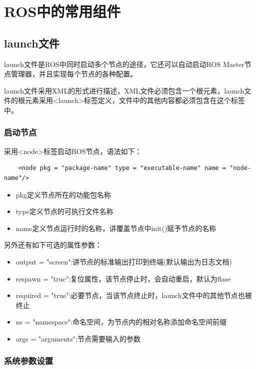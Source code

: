 \documentclass[9pt, oneside]{book}
\begin{document}
\chapter{ROS中的常用组件}

\section{launch文件}

launch文件是ROS中同时启动多个节点的途径，它还可以自动启动ROS Master节点管理器，并且实现每个节点的各种配置。

launch文件采用XML的形式进行描述，XML文件必须包含一个根元素，launch文件的根元素采用<launch>标签定义，文件中的其他内容都必须包含在这个标签中。

\subsection{启动节点}

采用<node>标签启动ROS节点，语法如下：

\begin{verbatim}
    <node pkg = "package-name" type = "executable-name" name = "node-name"/>
\end{verbatim}

\begin{itemize}
    \item pkg定义节点所在的功能包名称
    \item type定义节点的可执行文件名称
    \item name定义节点运行时的名称，讲覆盖节点中init()赋予节点的名称
\end{itemize}

另外还有如下可选的属性参数：

\begin{itemize}
    \item output = "screen":讲节点的标准输出打印到终端(默认输出为日志文档)
    \item respawn = "true":复位属性，该节点停止时，会自动重启，默认为flase
    \item required = "true":必要节点，当该节点终止时，launch文件中的其他节点也被终止
    \item ns = "namespace":命名空间，为节点内的相对名称添加命名空间前缀
    \item args = "arguments":节点需要输入的参数
\end{itemize}

\subsection{系统参数设置}
\end{document}
